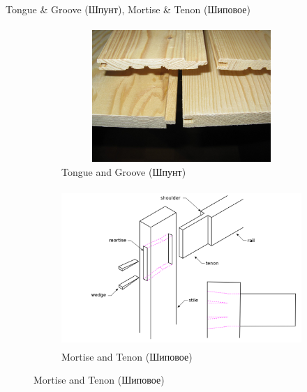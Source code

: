 \documentclass[aspectratio=169]{beamer}
\begin{document}
\begin{frame}[t]{Tongue \& Groove (Шпунт), Mortise \& Tenon (Шиповое)}
    \framesubtitle{}
    \begin{figure}[H]
        \begin{subfigure}{0.49\textwidth}
            \centering\includegraphics[height=5cm,width=1\textwidth,keepaspectratio]{spund.jpg}
            \caption*{Tongue and Groove (Шпунт)}
            \label{fig:spund.jpg}
        \end{subfigure}
        \begin{subfigure}{0.49\textwidth}
            \centering\includegraphics[height=6cm,width=1\textwidth,keepaspectratio]{Mortise.png}
            \caption*{Mortise and Tenon (Шиповое)}
            \label{fig:Mortise.png}
        \end{subfigure}
    \end{figure}
\end{frame}
\end{document}

